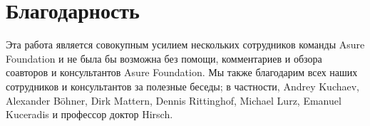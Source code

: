 \section{Благодарность}

Эта работа является совокупным усилием нескольких сотрудников команды Asure Foundation и не была бы возможна без помощи, комментариев и обзора соавторов и консультантов Asure Foundation. Мы также благодарим всех наших сотрудников и консультантов за полезные беседы; в частности, Andrey Kuchaev, Alexander Böhner, Dirk Mattern, Dennis Rittinghof, Michael Lurz, Emanuel Kuceradis и профессор доктор Hirsch.
